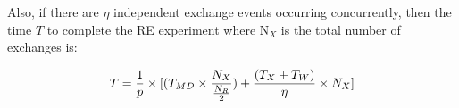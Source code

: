 \documentclass{rspublic}
\newcommand{\jhanote}[1]{ {\textcolor{red} { ***shantenu: #1 }}}
\newcommand{\alnote}[1]{ {\textcolor{blue} { ***andre: #1 }}}
\newcommand{\athotanote}[1]{ {\textcolor{green} { ***athota: #1 }}}
\newcommand{\alnote}[1]{}
\newcommand{\athotanote}[1]{}
\newcommand{\jhanote}[1]{}
\begin{document}

Also, if there are $\eta$ independent exchange events occurring
concurrently, then the time $T$ to complete the RE experiment where
N$_X$ is the total number of exchanges is:

\begin{eqnarray}
T = {1\over p} \times [(T_{MD} \times  {N_X \over {N_R \over 2}}) + {(T_{X} + T_{W}) \over \eta} \times N_X]
\label{eq:totaltime}
\end{eqnarray}






\end{document}
